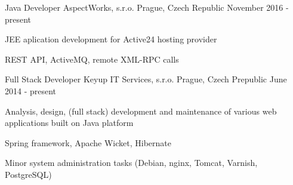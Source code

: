\begin{cventries}
  \cventry
    {Java Developer}
    {AspectWorks, s.r.o.}
    {Prague, Czech Republic}
    {November 2016 - present}
    {
      \begin{cvitems}
        \item {JEE aplication development for Active24 hosting provider}
        \item {REST API, ActiveMQ, remote XML-RPC calls}
      \end{cvitems}
    }
  \cventry
    {Full Stack Developer}
    {Keyup IT Services, s.r.o.}
    {Prague, Czech Prepublic}
    {June 2014 - present}
    {
      \begin{cvitems}
        \item {Analysis, design, (full stack) development and maintenance of various web applications built on Java platform}
        \item {Spring framework, Apache Wicket, Hibernate}
        \item {Minor system administration tasks (Debian, nginx, Tomcat, Varnish, PostgreSQL)}
      \end{cvitems}
    }
\end{cventries}
